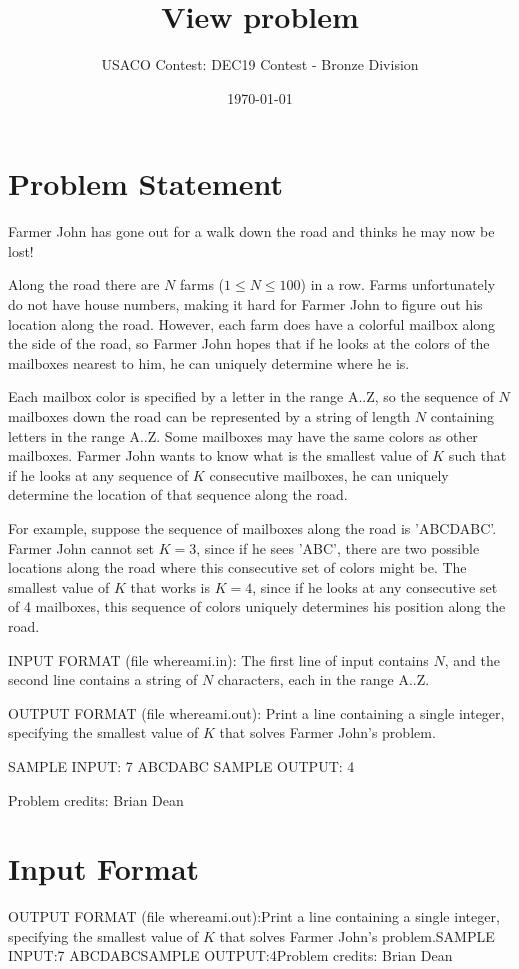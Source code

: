 \documentclass[12pt]{article}
\title{View problem}
\author{USACO Contest: DEC19 Contest - Bronze Division}
\date{\today}
\begin{document}
\maketitle

\section*{Problem Statement}

Farmer John has gone out for a walk down the road and thinks he may now be lost!

Along the road there are $N$ farms ($1 \leq N \leq 100$) in a row.  Farms unfortunately 
do not have house numbers, making it hard for Farmer John to figure out his location
along the road.  However, each farm does have a colorful mailbox along the side of the
road, so Farmer John hopes that if he looks at the colors of the mailboxes
nearest to him, he can uniquely determine where he is.

Each mailbox color is specified by a letter in the range A..Z, so the sequence of $N$
mailboxes down the road can be represented by a string of length $N$ containing 
letters in the range A..Z.  Some mailboxes may have the same colors as other mailboxes.
Farmer John wants to know what is the smallest value of $K$ such that if he looks at
any sequence of $K$ consecutive mailboxes, he can uniquely determine the location
of that sequence along the road.

For example, suppose the sequence of mailboxes along the road is 'ABCDABC'.  Farmer 
John cannot set $K=3$, since if he sees 'ABC', there are two possible locations along
the road where this consecutive set of colors might be.  The smallest value of $K$
that works is $K=4$, since if he looks at any consecutive set of 4 mailboxes,
this sequence of colors uniquely determines his position along the road.

INPUT FORMAT (file whereami.in):
The first line of input contains $N$, and the second line contains a string of $N$ characters, each in the range A..Z.

OUTPUT FORMAT (file whereami.out):
Print a line containing a single integer, specifying the smallest value of $K$ that
solves Farmer John's problem.

SAMPLE INPUT:
7
ABCDABC
SAMPLE OUTPUT: 
4

Problem credits: Brian Dean



\section*{Input Format}
OUTPUT FORMAT (file whereami.out):Print a line containing a single integer, specifying the smallest value of $K$ that
solves Farmer John's problem.SAMPLE INPUT:7
ABCDABCSAMPLE OUTPUT:4Problem credits: Brian Dean
\end{document}
